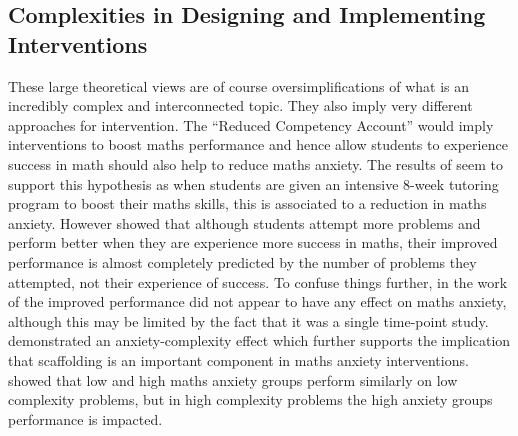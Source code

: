 \documentclass[14pt]{memoir}
\begin{document}
\subsection*{Complexities in Designing and Implementing Interventions}

These large theoretical views are of course oversimplifications of what is an incredibly complex and interconnected topic. They also imply very different approaches for intervention. The ``Reduced Competency Account'' would imply interventions to boost maths performance and hence allow students to experience success in math should also help to reduce maths anxiety. The results of   seem to support this hypothesis as when students are given an intensive 8-week tutoring program to boost their maths skills, this is associated to a reduction in maths anxiety. However  showed that although students attempt more problems and perform better when they are experience more success in maths, their improved performance is almost completely predicted by the number of problems they attempted, not their experience of success. To confuse things further, in the work of  the improved performance did not appear to have any effect on maths anxiety, although this may be limited by the fact that it was a single time-point study.  demonstrated an anxiety-complexity effect which further supports the implication that scaffolding is an important component in maths anxiety interventions.  showed that low and high maths anxiety groups perform similarly on low complexity problems, but in high complexity problems the high anxiety groups performance is impacted.
	
\end{document}
